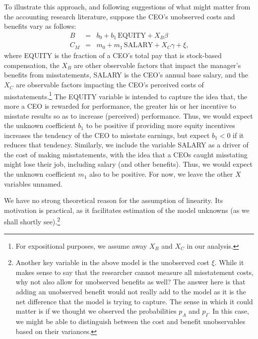 \documentclass[12pt,reqno,titlepage]{amsart}
\theoremstyle{definition}
\begin{document}
\begin{doublespace}
To illustrate this approach, and following suggestions of what might matter from the
accounting research literature, suppose the CEO's unobserved costs and benefits vary as follows:
%
\begin{equation}
\begin{array}{lcl}\label{eqns1}
B & = & b_0 + b_1 \, \mbox{EQUITY} + X_B\beta\\[.5em]
C_M & = & m_0 + m_1 \, \mbox{SALARY} + X_C\gamma + \xi \text{,} %
\end{array}
\end{equation}
where EQUITY is the fraction of a CEO's total pay that is stock-based compensation, 
the $X_B$ are other observable factors that impact the manager's benefits from misstatements,
SALARY is the CEO's annual base salary, and the $X_C$ are observable factors impacting the CEO's perceived costs of misstatements.\footnote{
For expositional purposes, we assume away $X_B$ and $X_C$ in our analysis.}
The EQUITY variable is intended to capture the idea that, the more a CEO is rewarded for performance, the greater his or her incentive to misstate results so as to increase (perceived) performance.
Thus, we would expect the unknown coefficient $b_1$ to be positive if providing more equity incentives increases the tendency of the CEO to misstate earnings, but expect $b_1 < 0$ if it reduces that tendency.
Similarly, we include the variable SALARY as a driver of the cost of making misstatements, with the idea that a CEOs caught misstating might lose their job, including salary (and other benefits).
Thus, we would expect the unknown coefficient $m_1$ also to be positive.
For now, we leave the other $X$ variables unnamed.

We have no strong theoretical reason for the assumption of linearity. Its motivation is practical, as it facilitates estimation of the model unknowns (as we shall shortly see).\footnote{Another key variable in the above model is the unobserved cost $\xi$.
While it makes sense to say that the researcher cannot measure all misstatement costs, why not also allow for unobserved benefits as well?
The answer here is that adding an unobserved benefit would not really add to the model as it is the net difference that the model is trying to capture.
The sense in which it could matter is if we thought we observed the probabilities $p_A$ and $p_I$.
In this case, we might be able to distinguish between the cost and benefit unobservables based on their variances.}
 

\end{doublespace}
\end{document}
